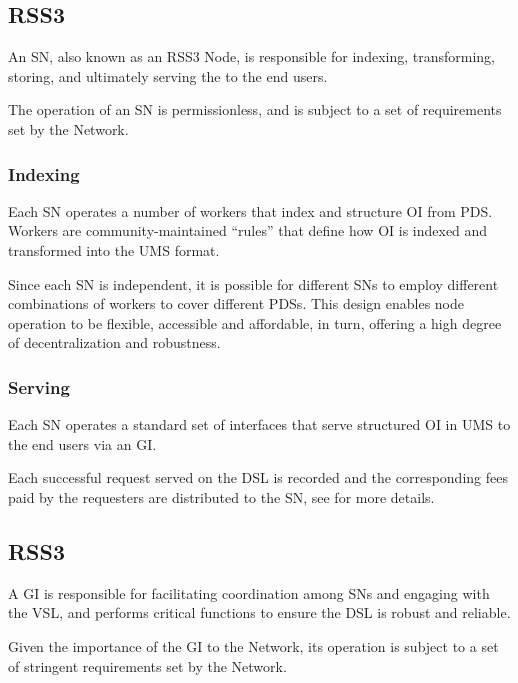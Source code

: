 \subsection{RSS3 }
\label{subsec:SN}

An \gls{SN}, also known as an RSS3 Node, is responsible for indexing, transforming, storing, and ultimately serving the  to the end users.

The operation of an \gls{SN} is permissionless, and is subject to a set of requirements set by the Network.

\subsubsection{Indexing}
Each \gls{SN} operates a number of workers that index and structure \gls{OI} from \gls{PDS}.
Workers are community-maintained ``rules'' that define how \gls{OI} is indexed and transformed into the \gls{UMS} format.

Since each \gls{SN} is independent, it is possible for different \glspl{SN} to employ different combinations of workers to cover different \glspl{PDS}.
This design enables node operation to be flexible, accessible and affordable, in turn, offering a high degree of decentralization and robustness.

\subsubsection{Serving}
Each \gls{SN} operates a standard set of interfaces that serve structured \gls{OI} in \gls{UMS} to the end users via an \gls{GI}.

Each successful request served on the \gls{DSL} is recorded and the corresponding fees paid by the requesters are distributed to the \gls{SN}, see  for more details.

\subsection{RSS3 }
\label{subsec:GI}

A \gls{GI} is responsible for facilitating coordination among \glspl{SN} and engaging with the \gls{VSL}, and performs critical functions to ensure the \gls{DSL} is robust and reliable.

Given the importance of the \gls{GI} to the Network, its operation is subject to a set of stringent requirements set by the Network.

